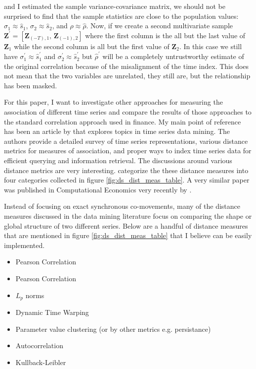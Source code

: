 \documentclass[12pt]{article}
\begin{document}
and I estimated the sample variance-covariance matrix, we should not be surprised to find that the sample statistics are close to the population values: $\sigma_{1} \approx \hat{s}_{1}$, $\sigma_{2} \approx \hat{s}_{2}$, and $\rho \approx \hat{\rho}$. Now, if we create a second multivariate sample $\boldsymbol{Z}^\prime = [\boldsymbol{Z}_{(-T), 1}, \, \boldsymbol{Z}_{(-1), 2}]$ where the first column is the all but the last value of $\boldsymbol{Z}_{1}$ while the second column is all but the first value of $\boldsymbol{Z}_{2}$. In this case we still have $\sigma^{\prime}_{1} \approx \hat{s}^{\prime}_{1}$ and $\sigma^{\prime}_{2} \approx \hat{s}^{\prime}_{2}$ but $\hat{\rho}^{\prime}$ will be a completely untrustworthy estimate of the original correlation because of the misalignment of the time index. This does not mean that the two variables are unrelated, they still are, but the relationship has been masked.

For this paper, I want to investigate other approaches for measuring the association of different time series and compare the results of those approaches to the standard correlation approach used in finance. My main point of reference has been an article by \cite{ElsingAgon2012} that explores topics in time series data mining. The authors provide a detailed survey of time series representations, various distance metrics for measures of association, and proper ways to index time series data for efficient querying and information retrieval. The discussions around various distance metrics are very interesting. \cite{ElsingAgon2012} categorize the these distance measures into four categories collected in figure \ref{fig:ds_dist_meas_table}. A very similar paper was published in Computational Economics very recently by \cite{FrancesWiemann2020}.

Instead of focusing on exact synchronous co-movements, many of the distance measures discussed in the data mining literature focus on comparing the shape or global structure of two different series. Below are a handful of distance measures that are mentioned in figure \ref{fig:ds_dist_meas_table} that I believe can be easily implemented.

\begin{itemize}
    \item Pearson Correlation
\end{itemize}

\begin{itemize}
    \item Pearson Correlation
    \item $L_{p}$ norms
    \item Dynamic Time Warping
    \item Parameter value clustering (or by other metrics e.g. persistance)
    \item Autocorrelation
    \item Kullback-Leibler
\end{itemize}
\end{document}
